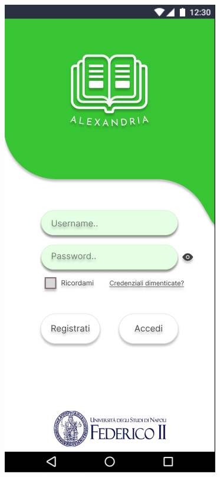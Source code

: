  \begin{figure}
\centering
\begin{minipage}{.5\textwidth}
  \centering
  \includegraphics[width=.60\textwidth]{Immagini/Alexandria/Screen/login.PNG} 
\end{minipage}%
\begin{minipage}{.5\textwidth}
  \centering

\end{minipage}
\end{figure}
